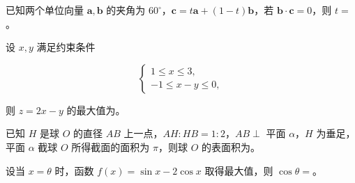 \begin{question}
已知两个单位向量 $\boldsymbol a,\boldsymbol b$ 的夹角为 $60^\circ$，$\boldsymbol c=t\boldsymbol a+(1-t)\boldsymbol b$，若 $\boldsymbol b\cdot\boldsymbol c=0$，则 $t=$\gkblank{}。

\end{question}
\begin{question}
设 $x,y$ 满足约束条件

\nopagebreak[4]
\[
\begin{cases}
1\leqslant x\leqslant3,\\
-1\leqslant x-y\leqslant0,
\end{cases}
\]

则 $z=2x-y$ 的最大值为\gkblank{}。

\end{question}
\begin{question}
已知 $H$ 是球 $O$ 的直径 $AB$ 上一点，$AH:HB=1:2$，$AB\perp$ 平面 $\alpha$，$H$ 为垂足，平面 $\alpha$ 截球 $O$ 所得截面的面积为 $\pi$，则球 $O$ 的表面积为\gkblank{}。

\end{question}
\begin{question}
设当 $x=\theta$ 时，函数 $f(x)=\sin x-2\cos x$ 取得最大值，则 $\cos\theta=$\gkblank{}。

\end{question}

